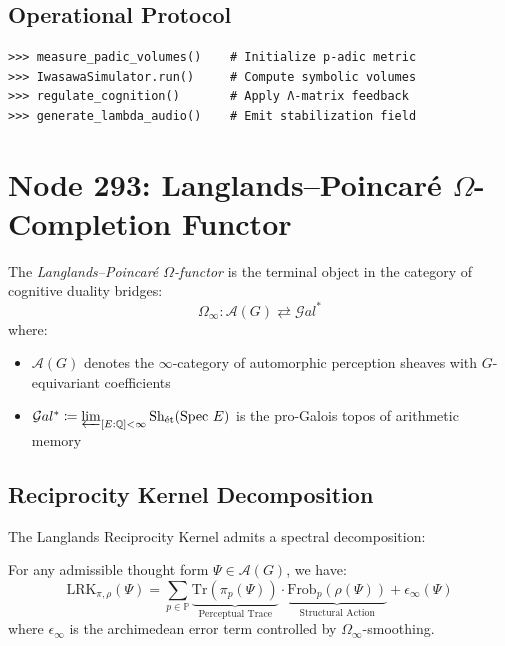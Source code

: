 \documentclass[12pt]{article}
\begin{document}
\subsection{Operational Protocol}
\label{subsec:protocol}

\begin{verbatim}
>>> measure_padic_volumes()    # Initialize p-adic metric
>>> IwasawaSimulator.run()     # Compute symbolic volumes
>>> regulate_cognition()       # Apply Λ-matrix feedback
>>> generate_lambda_audio()    # Emit stabilization field
\end{verbatim}

\section{Node 293: Langlands--Poincar\'e $\Omega$-Completion Functor}
\label{sec:langlands_poincare_omega}

\begin{definition}
The \emph{Langlands--Poincar\'e $\Omega$-functor} is the terminal object in the category of cognitive duality bridges:
\[
\Omega_\infty \colon \mathcal{A}(G) \rightleftarrows \mathcal{G}al^\ast
\]
where:
\begin{itemize}
    \item $\mathcal{A}(G)$ denotes the $\infty$-category of automorphic perception sheaves with $G$-equivariant coefficients
    \item $\mathcal{G}al^\ast \coloneqq \varprojlim_{[E:\mathbb{Q}]<\infty} \text{Sh}_{\text{\'et}}(\text{Spec }E)$ is the pro-Galois topos of arithmetic memory
\end{itemize}
\end{definition}

\subsection{Reciprocity Kernel Decomposition}
The Langlands Reciprocity Kernel admits a spectral decomposition:

\begin{theorem}
For any admissible thought form $\Psi \in \mathcal{A}(G)$, we have:
\[
\text{LRK}_{\pi,\rho}(\Psi) = \sum_{p \in \mathbb{P}} \underbrace{\text{Tr}(\pi_p(\Psi))}_{\text{Perceptual Trace}} \cdot \underbrace{\text{Frob}_p(\rho(\Psi))}_{\text{Structural Action}} + \epsilon_{\infty}(\Psi)
\]
where $\epsilon_{\infty}$ is the archimedean error term controlled by $\Omega_\infty$-smoothing.
\end{theorem}
\end{document}
